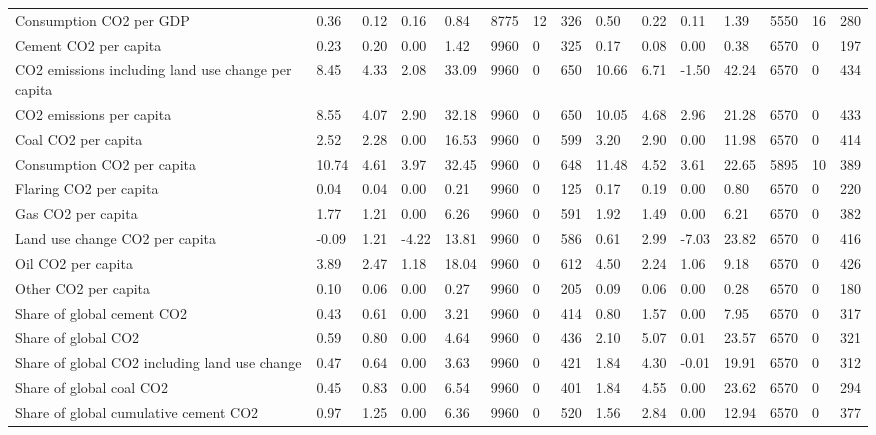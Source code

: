 \begin{longtable}{lllllllllllllll}
\addlinespace
Consumption CO2 per GDP & 0.36 & 0.12 & 0.16 & 0.84 & 8775 & 12 & 326 & 0.50 & 0.22 & 0.11 & 1.39 & 5550 & 16 & 280\\
Cement CO2 per capita & 0.23 & 0.20 & 0.00 & 1.42 & 9960 & 0 & 325 & 0.17 & 0.08 & 0.00 & 0.38 & 6570 & 0 & 197\\
CO2 emissions including land use change per capita & 8.45 & 4.33 & 2.08 & 33.09 & 9960 & 0 & 650 & 10.66 & 6.71 & -1.50 & 42.24 & 6570 & 0 & 434\\
CO2 emissions per capita & 8.55 & 4.07 & 2.90 & 32.18 & 9960 & 0 & 650 & 10.05 & 4.68 & 2.96 & 21.28 & 6570 & 0 & 433\\
Coal CO2 per capita & 2.52 & 2.28 & 0.00 & 16.53 & 9960 & 0 & 599 & 3.20 & 2.90 & 0.00 & 11.98 & 6570 & 0 & 414\\
\addlinespace
Consumption CO2 per capita & 10.74 & 4.61 & 3.97 & 32.45 & 9960 & 0 & 648 & 11.48 & 4.52 & 3.61 & 22.65 & 5895 & 10 & 389\\
Flaring CO2 per capita & 0.04 & 0.04 & 0.00 & 0.21 & 9960 & 0 & 125 & 0.17 & 0.19 & 0.00 & 0.80 & 6570 & 0 & 220\\
Gas CO2 per capita & 1.77 & 1.21 & 0.00 & 6.26 & 9960 & 0 & 591 & 1.92 & 1.49 & 0.00 & 6.21 & 6570 & 0 & 382\\
Land use change CO2 per capita & -0.09 & 1.21 & -4.22 & 13.81 & 9960 & 0 & 586 & 0.61 & 2.99 & -7.03 & 23.82 & 6570 & 0 & 416\\
Oil CO2 per capita & 3.89 & 2.47 & 1.18 & 18.04 & 9960 & 0 & 612 & 4.50 & 2.24 & 1.06 & 9.18 & 6570 & 0 & 426\\
\addlinespace
Other CO2 per capita & 0.10 & 0.06 & 0.00 & 0.27 & 9960 & 0 & 205 & 0.09 & 0.06 & 0.00 & 0.28 & 6570 & 0 & 180\\
Share of global cement CO2 & 0.43 & 0.61 & 0.00 & 3.21 & 9960 & 0 & 414 & 0.80 & 1.57 & 0.00 & 7.95 & 6570 & 0 & 317\\
Share of global CO2 & 0.59 & 0.80 & 0.00 & 4.64 & 9960 & 0 & 436 & 2.10 & 5.07 & 0.01 & 23.57 & 6570 & 0 & 321\\
Share of global CO2 including land use change & 0.47 & 0.64 & 0.00 & 3.63 & 9960 & 0 & 421 & 1.84 & 4.30 & -0.01 & 19.91 & 6570 & 0 & 312\\
Share of global coal CO2 & 0.45 & 0.83 & 0.00 & 6.54 & 9960 & 0 & 401 & 1.84 & 4.55 & 0.00 & 23.62 & 6570 & 0 & 294\\
\addlinespace
Share of global cumulative cement CO2 & 0.97 & 1.25 & 0.00 & 6.36 & 9960 & 0 & 520 & 1.56 & 2.84 & 0.00 & 12.94 & 6570 & 0 & 377\\

\end{longtable}

